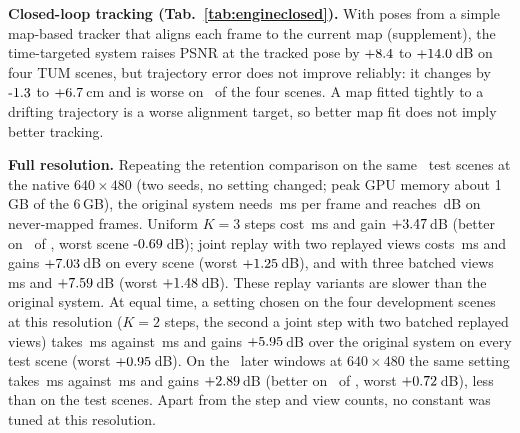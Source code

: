 \documentclass[10pt,twocolumn,letterpaper]{article}
\begin{document}


\textbf{Closed-loop tracking (Tab.~\ref{tab:engineclosed}).} With poses from a simple map-based tracker that aligns each frame to the current map (supplement), the time-targeted system raises PSNR at the tracked pose by $+8.4$ to $+14.0$\,dB on four TUM scenes, but trajectory error does not improve reliably: it changes by $\engClosedDAteMin$ to $+6.7$\,cm and is worse on \engClosedAteWorse\ of the four scenes. A map fitted tightly to a drifting trajectory is a worse alignment target, so better map fit does not imply better tracking.



\textbf{Full resolution.} Repeating the retention comparison on the same \engHiResN\ test scenes at the native $640{\times}480$ (two seeds, no setting changed; peak GPU memory about 1\,GB of the 6\,GB), the original system needs \engHiResOrigMs\,ms per frame and reaches \engHiResOrigFinal\,dB on never-mapped frames. Uniform $K{=}3$ steps cost \engHiResKThreeMs\,ms and gain $+3.47$\,dB (better on \engHiResKThreePos\ of \engHiResN, worst scene $\engHiResKThreeWorst$\,dB); joint replay with two replayed views costs \engHiResKThreeJrMs\,ms and gains $+7.03$\,dB on every scene (worst $+1.25$\,dB), and with three batched views \engHiResKThreeJrThreeBMs\,ms and $+7.59$\,dB (worst $+1.48$\,dB). These replay variants are slower than the original system. At equal time, a setting chosen on the four development scenes at this resolution ($K{=}2$ steps, the second a joint step with two batched replayed views) takes \engHiResKTwoJrTwoBMs\,ms against \engHiResOrigMs\,ms and gains $+5.95$\,dB over the original system on every test scene (worst $+0.95$\,dB). On the \engHiResFreshN\ later windows at $640{\times}480$ the same setting takes \engHiResFreshKTwoJrTwoBMs\,ms against \engHiResFreshOrigMs\,ms and gains $+2.89$\,dB (better on \engHiResFreshKTwoJrTwoBPos\ of \engHiResFreshN, worst $+0.72$\,dB), less than on the test scenes. Apart from the step and view counts, no constant was tuned at this resolution.
\end{document}
